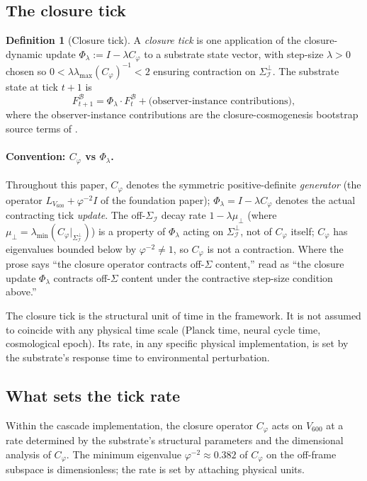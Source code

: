 \documentclass[11pt]{article}
\theoremstyle{plain}
\theoremstyle{definition}
\newtheorem{definition}[theorem]{Definition}
\theoremstyle{remark}
\newcommand{\Ical}{\mathcal{I}}
\newcommand{\Cph}{C_\varphi}
\begin{document}
\subsection{The closure tick}

\begin{definition}[Closure tick]\label{def:closure-tick}
A \emph{closure tick} is one application of the closure-dynamic update $\Phi_\lambda := I - \lambda \Cph$ to a substrate state vector, with step-size $\lambda > 0$ chosen so $0 < \lambda \lambda_{\max}(\Cph)^{-1} < 2$ ensuring contraction on $\Sigma_\Ical^\perp$. The substrate state at tick $t+1$ is
\[
  F^\mathcal{B}_{t+1} = \Phi_\lambda \cdot F^\mathcal{B}_t + \text{(observer-instance contributions)},
\]
where the observer-instance contributions are the closure-cosmogenesis bootstrap source terms of \citet{SmartClosureCosmogenesis}.
\end{definition}

\paragraph{Convention: $\Cph$ vs $\Phi_\lambda$.} Throughout this paper, $\Cph$ denotes the symmetric positive-definite \emph{generator} (the operator $L_{V_{600}} + \varphi^{-2} I$ of the foundation paper); $\Phi_\lambda = I - \lambda \Cph$ denotes the actual contracting tick \emph{update}. The off-$\Sigma_\Ical$ decay rate $1 - \lambda \mu_\perp$ (where $\mu_\perp = \lambda_{\min}(\Cph|_{\Sigma_\Ical^\perp})$) is a property of $\Phi_\lambda$ acting on $\Sigma_\Ical^\perp$, not of $\Cph$ itself; $\Cph$ has eigenvalues bounded below by $\varphi^{-2} \neq 1$, so $\Cph$ is not a contraction. Where the prose says ``the closure operator contracts off-$\Sigma$ content,'' read as ``the closure update $\Phi_\lambda$ contracts off-$\Sigma$ content under the contractive step-size condition above.''

The closure tick is the structural unit of time in the framework. It is not assumed to coincide with any physical time scale (Planck time, neural cycle time, cosmological epoch). Its rate, in any specific physical implementation, is set by the substrate's response time to environmental perturbation.

\subsection{What sets the tick rate}

Within the cascade implementation, the closure operator $\Cph$ acts on $V_{600}$ at a rate determined by the substrate's structural parameters and the dimensional analysis of $\Cph$. The minimum eigenvalue $\varphi^{-2} \approx 0.382$ of $\Cph$ on the off-frame subspace is dimensionless; the rate is set by attaching physical units.
\end{document}
